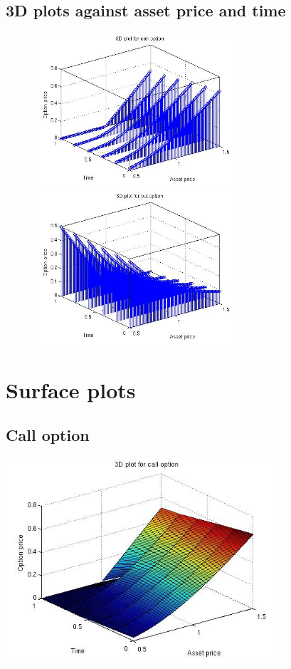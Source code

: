 \documentclass[12pt]{article}
\begin{document}
  \subsection*{3D plots against asset price and time}
    \begin{figure}[ht]
    \centering
      \begin{minipage}{.45\textwidth}
        \centering
        \includegraphics[width=3in]{callstem.jpg}
      \end{minipage}
      \begin{minipage}{.45\textwidth}
        \centering
        \includegraphics[width=3in]{putstem.jpg}
      \end{minipage}
    \end{figure}

\newpage
\section{Surface plots}
  \subsection*{Call option}
    \begin{center}
      \includegraphics[width=4in]{callsurf.jpg}
    \end{center}
\end{document}
